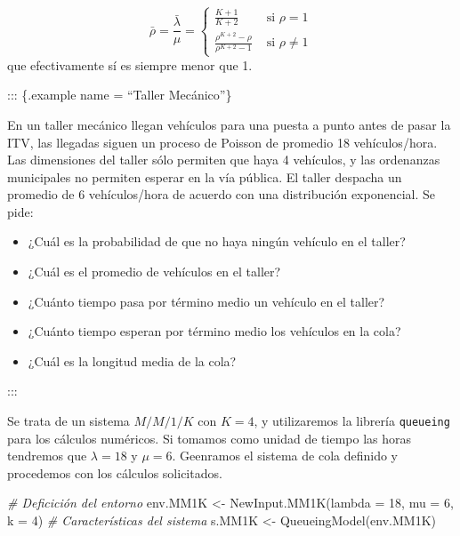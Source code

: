 \documentclass[
]{book}
\newenvironment{Shaded}{\begin{snugshade}}{\end{snugshade}}
\newcommand{\AttributeTok}[1]{\textcolor[rgb]{0.77,0.63,0.00}{#1}}
\newcommand{\CommentTok}[1]{\textcolor[rgb]{0.56,0.35,0.01}{\textit{#1}}}
\newcommand{\DecValTok}[1]{\textcolor[rgb]{0.00,0.00,0.81}{#1}}
\newcommand{\FunctionTok}[1]{\textcolor[rgb]{0.00,0.00,0.00}{#1}}
\newcommand{\NormalTok}[1]{#1}
\newcommand{\OtherTok}[1]{\textcolor[rgb]{0.56,0.35,0.01}{#1}}
\providecommand{\tightlist}{%
  \setlength{\itemsep}{0pt}\setlength{\parskip}{0pt}}
\theoremstyle{definition}
\theoremstyle{definition}
\theoremstyle{definition}
\theoremstyle{definition}
\theoremstyle{remark}
\begin{document}
\[
\bar{\rho} = \frac{\bar{\lambda}}{\mu} =
\begin{cases}
\frac{K+1}{K+2} & \text{ si } \rho = 1 \\
\frac{\rho^{K+2}-\rho}{\rho^{K+2}-1} & \text{ si } \rho \neq 1 
\end{cases}
\]
que efectivamente sí es siempre menor que 1.

::: \{.example name = ``Taller Mecánico''\}

En un taller mecánico llegan vehículos para una puesta a punto antes de pasar la ITV, las llegadas siguen un proceso de Poisson de promedio 18 vehículos/hora. Las dimensiones del taller sólo permiten que haya 4 vehículos, y las ordenanzas municipales no permiten esperar en la vía pública. El taller despacha un promedio de 6 vehículos/hora de acuerdo con una distribución exponencial. Se pide:

\begin{itemize}
\tightlist
\item
  ¿Cuál es la probabilidad de que no haya ningún vehículo en el taller?
\item
  ¿Cuál es el promedio de vehículos en el taller?
\item
  ¿Cuánto tiempo pasa por término medio un vehículo en el taller?
\item
  ¿Cuánto tiempo esperan por término medio los vehículos en la cola?
\item
  ¿Cuál es la longitud media de la cola?
\end{itemize}

:::

Se trata de un sistema \(M/M/1/K\) con \(K = 4\), y utilizaremos la librería \texttt{queueing} para los cálculos numéricos. Si tomamos como unidad de tiempo las horas tendremos que \(\lambda = 18\) y \(\mu = 6\). Geenramos el sistema de cola definido y procedemos con los cálculos solicitados.

\begin{Shaded}
\begin{Highlighting}[]
\CommentTok{\# Deficición del entorno}
\NormalTok{env.MM1K }\OtherTok{\textless{}{-}} \FunctionTok{NewInput.MM1K}\NormalTok{(}\AttributeTok{lambda =} \DecValTok{18}\NormalTok{, }\AttributeTok{mu =} \DecValTok{6}\NormalTok{, }\AttributeTok{k =} \DecValTok{4}\NormalTok{)}
\CommentTok{\# Características del sistema}
\NormalTok{s.MM1K }\OtherTok{\textless{}{-}} \FunctionTok{QueueingModel}\NormalTok{(env.MM1K)}
\end{Highlighting}
\end{Shaded}
\end{document}
